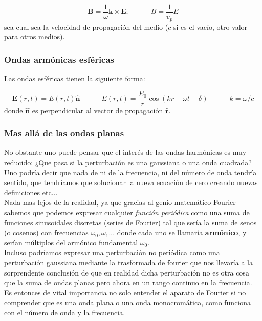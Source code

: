 \documentclass[12pt]{article}
\newcommand{\tquad}{\quad \quad \quad}
\newcommand{\Bn}{\mathbf{B}}
\newcommand{\En}{\mathbf{E}}
\newcommand{\kn}{\mathbf{k}}
\newcommand{\hnn}{\hat{\mathbf{n}}}
\newcommand{\hnr}{\hat{\mathbf{r}}}
\numberwithin{equation}{section}
\numberwithin{figure}{section}
\begin{document}
\begin{equation}
\Bn = \dfrac{1}{\omega} \kn \times \En ; \tquad B = \dfrac{1}{v_p} E
\end{equation}
sea cual sea la velocidad de propagación del medio ($c$ si es el vacío, otro valor para otros medios). 


\subsubsection{Ondas armónicas esféricas}


Las ondas esféricas tienen la siguiente forma:

\begin{equation}
\En (r,t) = E(r,t) \hnn \tquad E(r,t) = \dfrac{E_0}{r} \cos (kr-\omega t + \delta) \tquad k = \omega/c
\end{equation}
donde $\hnn$ es perpendicular al vector de propagación $\hnr$.

 

\subsubsection{Mas allá de las ondas planas}

No obstante uno puede pensar que el interés de las ondas harmónicas es muy reducido: ¿Que pasa si la perturbación es una gaussiana o una onda cuadrada? Uno podría decir que nada de ni de la frecuencia, ni del número de onda tendría sentido, que tendríamos que solucionar la nueva ecuación de cero creando nuevas definiciones etc... \\

Nada mas lejos de la realidad, ya que gracias al genio matemático Fourier sabemos que podemos expresar cualquier \textit{función periódica} como una suma de funciones sinusoidales discretas (series de Fourier) tal que sería la suma de senos (o cosenos) con frecuencias $\omega_0,\omega_1...$ donde cada uno se llamaría \textbf{armónico}, y serían múltiplos del armónico fundamental $\omega_0$. \\

Incluso podríamos expresar una perturbación no periódica como una perturbación gaussiana mediante la trasformada de fourier que nos llevaría a la sorprendente conclusión de que en realidad dicha perturbación no es otra cosa que la suma de ondas planas pero ahora en un rango continuo en la frecuencia. \\

Es entonces de vital importancia no solo entender el aparato de Fourier si no comprender que es una onda plana o una onda monocromática, como funciona con el número de onda y la frecuencia.
\end{document}
